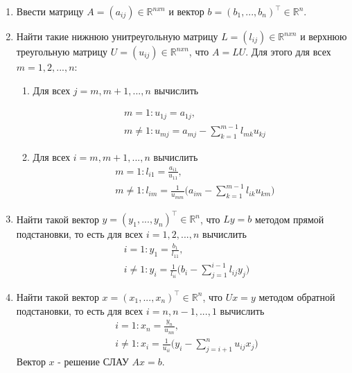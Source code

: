 \documentclass[a4paper, 12pt]{article}
\begin{document}
	\begin{enumerate}
		\item Ввести матрицу $A=(a_{ij})\in \mathbb{R}^{nxn}$ и вектор $b=(b_1,...,b_n)^\top\in \mathbb{R}^n$.
		\item Найти такие нижнюю унитреугольную матрицу $L=(l_{ij})\in \mathbb{R}^{nxn}$ и верхнюю треугольную матрицу $U=(u_{ij})\in \mathbb{R}^{nxn}$, что $A=LU$. Для этого 
		для всех $m = 1,2,...,n$:
		\begin{enumerate}
			\item Для всех $j = m,m+1,...,n$ вычислить

			\begin{equation} 
				\label{U_formula}
				\begin{aligned}
					&m=1:u_{1j}=a_{1j}, \\
					&m\neq 1: u_{mj}=a_{mj}-\sum\limits_{k=1}^{m-1}l_{mk}u_{kj}
				\end{aligned}
			\end{equation}
			\item Для всех $i = m,m+1,...,n$ вычислить
			\begin{equation}
				\label{L_formula}
				\begin{aligned}
					&m=1:l_{i1}=\frac{a_{i1}}{u_{11}},\\
					&m\neq 1:l_{im}=\frac{1}{u_{mm}}\Bigg(a_{im}-\sum\limits_{k=1}^{m-1} l_{ik}u_{km}\Bigg)
				\end{aligned}
			\end{equation}
		\end{enumerate}
		\item Найти такой вектор $y=(y_1,...,y_n)^\top \in \mathbb{R}^n$, что $Ly=b$ методом прямой подстановки, то есть для всех $i=1,2,...,n$ вычислить
		\begin{equation}
			\label{y_formula}
			\begin{aligned}
				&i=1:y_1=\frac{b_1}{l_{11}}, \\
				&i\neq 1:y_i=\frac{1}{l_{ii}}\Bigg(b_i-\sum\limits_{j=1}^{i-1}l_{ij}y_j\Bigg)
			\end{aligned}			
		\end{equation}
		\item Найти такой вектор $x=(x_1,...,x_n)^\top \in \mathbb{R}^n$, что $Ux=y$ методом обратной подстановки, то есть для всех $i=n,n-1,...,1$ вычислить
		\begin{equation}
			\label{x_formula}
			\begin{aligned}
				&i=1:x_n=\frac{y_n}{u_{nn}},\\
				&i\neq 1:x_i=\frac{1}{u_{ii}}\Bigg(y_i-\sum\limits_{j=i+1}^{n}u_{ij}x_j\Bigg)
			\end{aligned}
		\end{equation}
		Вектор $x$ - решение СЛАУ $Ax=b$.
	\end{enumerate}
\end{document}
